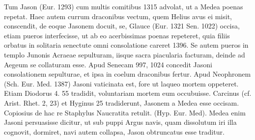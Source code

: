 \documentclass[a4paper, 11pt, oneside, polutonikogreek, german]{article}
\begin{document}
Tum Jason (Eur. 1293) cum multis comitibus 1315 advolat, ut a Medea poenas repetat. Haec autem currum draconibus vectum, quem Helius avus ei misit, conscendit, de eoque Jasonem docuit, se, Glauce (Eur. 1321 Sen. 1022) occisa, etiam pueros interfecisse, ut ab eo acerbissimas poenas repeteret, quia filiis orbatus in solitaria senectute omni consolatione careret 1396. Se autem pueros in templo Junonis Acraeae sepulturam, iisque sacra piacularia facturam, deinde ad Aegeum se collaturam esse. Apud Senecam 997, 1024 concedit Jasoni consolationem sepulturae, et ipsa in coelum draconibus fertur. Apud Neophronem (Sch. Eur. Med. 1387) Jasoni vaticinata est, fore ut laqueo mortem oppeteret. Etiam Diodorus 4. 55 tradidit, voluntariam mortem eum occubuisse. Carcinus (cf. Arist. Rhet. 2, 23) et Hyginus 25 tradiderunt, Jasonem a Medea esse occisam. Copiosius de hac re Staphylus Naucratita retulit. (Hyp. Eur. Med). Medea enim Jasoni persuasisse dicitur, ut sub puppi Argus navis, quam dissolutum iri illa cognovit, dormiret, navi autem collapsa, Jason obtruncatus esse traditur.
\end{document}

